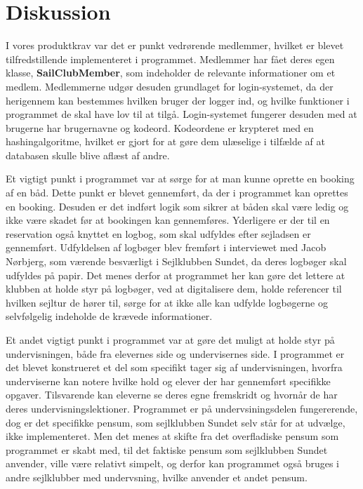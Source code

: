 \chapter{Diskussion}

\cbstart

I vores produktkrav var det er punkt vedrørende medlemmer, hvilket er blevet tilfredstillende implementeret i programmet. 
Medlemmer har fået deres egen klasse, \textbf{SailClubMember}, som indeholder de relevante informationer om et medlem. 
Medlemmerne udgør desuden grundlaget for login-systemet, da der herigennem kan bestemmes hvilken bruger der logger ind, og hvilke funktioner i programmet de skal have lov til at tilgå. 
Login-systemet fungerer desuden med at brugerne har brugernavne og kodeord. 
Kodeordene er krypteret med en hashingalgoritme, hvilket er gjort for at gøre dem ulæselige i tilfælde af at databasen skulle blive aflæst af andre. 

Et vigtigt punkt i programmet var at sørge for at man kunne oprette en booking af en båd. 
Dette punkt er blevet gennemført, da der i programmet kan oprettes en booking. 
Desuden er det indført logik som sikrer at båden skal være ledig og ikke være skadet før at bookingen kan gennemføres. 
Yderligere er der til en reservation også knyttet en logbog, som skal udfyldes efter sejladsen er gennemført. 
Udfyldelsen af logbøger blev fremført i interviewet med Jacob Nørbjerg, som værende besværligt i Sejlklubben Sundet, da deres logbøger skal udfyldes på papir. 
Det menes derfor at programmet her kan gøre det lettere at klubben at holde styr på logbøger, ved at digitalisere dem, holde referencer til hvilken sejltur de hører til, sørge for at ikke alle kan udfylde logbøgerne og selvfølgelig indeholde de krævede informationer. 

Et andet vigtigt punkt i programmet var at gøre det muligt at holde styr på undervisningen, både fra elevernes side og undervisernes side. 
I programmet er det blevet konstrueret et del som specifikt tager sig af undervisningen, hvorfra underviserne kan notere hvilke hold og elever der har gennemført specifikke opgaver.
Tilsvarende kan eleverne se deres egne fremskridt og hvornår de har deres undervisningslektioner.
Programmet er på undervsiningsdelen fungererende, dog er det specifikke pensum, som sejlklubben Sundet selv står for at udvælge, ikke implementeret. 
Men det menes at skifte fra det overfladiske pensum som programmet er skabt med, til det faktiske pensum som sejlklubben Sundet anvender, ville være relativt simpelt, og derfor kan programmet også bruges i andre sejlklubber med undervsning, hvilke anvender et andet pensum.

